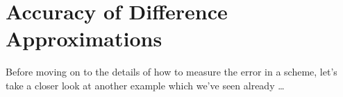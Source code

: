% 
%
%
%
%
%
%

\section{Accuracy of Difference Approximations}
\label{lab2:sec:first-deriv}  %
\label{lab2:sec:accuracy-main}

Before moving on to the details of how to measure the error in a
scheme, let's take a closer look at another example which we've seen
already \dots 

